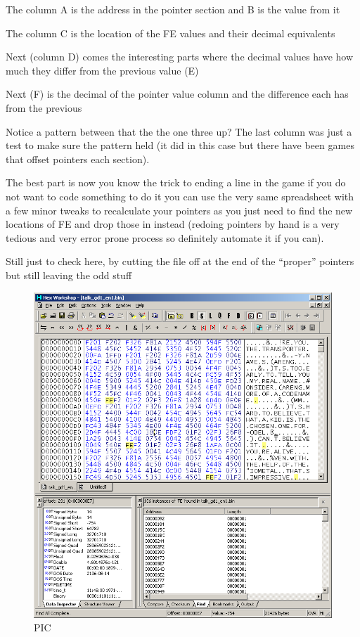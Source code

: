 \documentclass[
]{book}
\begin{document}
The column A is the address in the pointer section and B is the value from it

The column C is the location of the FE values and their decimal equivalents

Next (column D) comes the interesting parts where the decimal values have how much they differ from the previous value (E)

Next (F) is the decimal of the pointer value column and the difference each has from the previous

Notice a pattern between that the the one three up? The last column was just a test to make sure the pattern held (it did in this case but there have been games that offset pointers each section).

The best part is now you know the trick to ending a line in the game if you do not want to code something to do it you can use the very same spreadsheet with a few minor tweaks to recalculate your pointers as you just need to find the new locations of FE and drop those in instead (redoing pointers by hand is a very tedious and very error prone process so definitely automate it if you can).

Still just to check here, by cutting the file off at the end of the ``proper'' pointers but still leaving the odd stuff

\begin{figure}
\centering
\includegraphics{images/105_home_fast6191_romhackingguide_unrenamed_fil___borders_romhackingguidepointersexamplehexw4.png}
\caption{PIC}
\end{figure}
\end{document}
